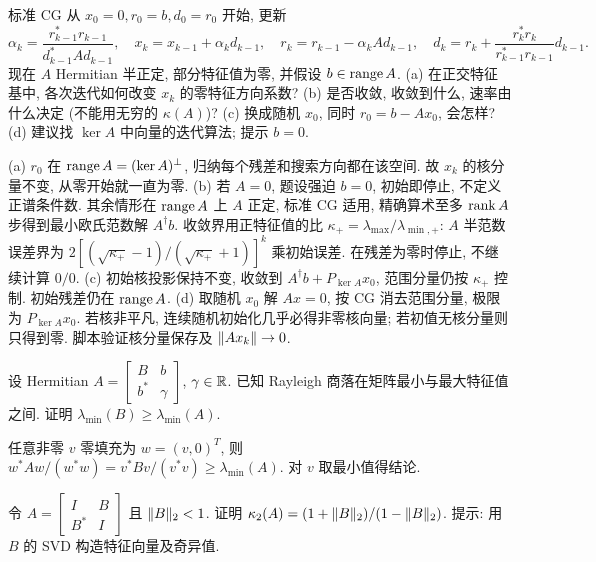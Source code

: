 \begin{exercise}\label{e2008:q3}
标准 CG 从 $x_0=0,r_0=b,d_0=r_0$ 开始, 更新
\[
 \alpha_k=\frac{r_{k-1}^*r_{k-1}}{d_{k-1}^*Ad_{k-1}},\quad
 x_k=x_{k-1}+\alpha_kd_{k-1},\quad r_k=r_{k-1}-\alpha_kAd_{k-1},\quad
 d_k=r_k+\frac{r_k^*r_k}{r_{k-1}^*r_{k-1}}d_{k-1}.
\]
现在 $A$ Hermitian 半正定, 部分特征值为零, 并假设 $b\in\operatorname{range} A$.
(a) 在正交特征基中, 各次迭代如何改变 $x_k$ 的零特征方向系数?
(b) 是否收敛, 收敛到什么, 速率由什么决定 (不能用无穷的 $\kappa(A)$)?
(c) 换成随机 $x_0$, 同时 $r_0=b-Ax_0$, 会怎样?
(d) 建议找 $\ker A$ 中向量的迭代算法; 提示 $b=0$.
\end{exercise}
\begin{solution}
(a) $r_0$ 在 $\operatorname{range} A=(\ker A)^\perp$, 归纳每个残差和搜索方向都在该空间. 故 $x_k$ 的核分量不变, 从零开始就一直为零.
(b) 若 $A=0$, 题设强迫 $b=0$, 初始即停止, 不定义正谱条件数. 其余情形在 $\operatorname{range} A$ 上 $A$ 正定, 标准 CG 适用, 精确算术至多 $\operatorname{rank} A$ 步得到最小欧氏范数解 $A^\dagger b$. 收敛界用正特征值的比 $\kappa_+=\lambda_{\max}/\lambda_{\min,+}$: $A$ 半范数误差界为 $2[(\sqrt{\kappa_+}-1)/(\sqrt{\kappa_+}+1)]^k$ 乘初始误差. 在残差为零时停止, 不继续计算 $0/0$.
(c) 初始核投影保持不变, 收敛到 $A^\dagger b+P_{\ker A}x_0$, 范围分量仍按 $\kappa_+$ 控制. 初始残差仍在 $\operatorname{range} A$.
(d) 取随机 $x_0$ 解 $Ax=0$, 按 CG 消去范围分量, 极限为 $P_{\ker A}x_0$. 若核非平凡, 连续随机初始化几乎必得非零核向量; 若初值无核分量则只得到零. 脚本验证核分量保存及 $\lVert Ax_k\rVert\to0$.
\end{solution}
\begin{exercise}\label{e2008:q4}
设 Hermitian $A=\begin{bmatrix}B&b\\b^*&\gamma\end{bmatrix}$, $\gamma\in\mathbb R$. 已知 Rayleigh 商落在矩阵最小与最大特征值之间. 证明 $\lambda_{\min}(B)\ge\lambda_{\min}(A)$.
\end{exercise}
\begin{solution}
任意非零 $v$ 零填充为 $w=(v,0)^T$, 则 $w^*Aw/(w^*w)=v^*Bv/(v^*v)\ge\lambda_{\min}(A)$. 对 $v$ 取最小值得结论.
\end{solution}
\begin{exercise}\label{e2008:q5}
令 $A=\begin{bmatrix}I&B\\B^*&I\end{bmatrix}$ 且 $\lVert B\rVert_2<1$. 证明 $\kappa_2(A)=(1+\lVert B\rVert_2)/(1-\lVert B\rVert_2)$. 提示: 用 $B$ 的 SVD 构造特征向量及奇异值.
\end{exercise}
